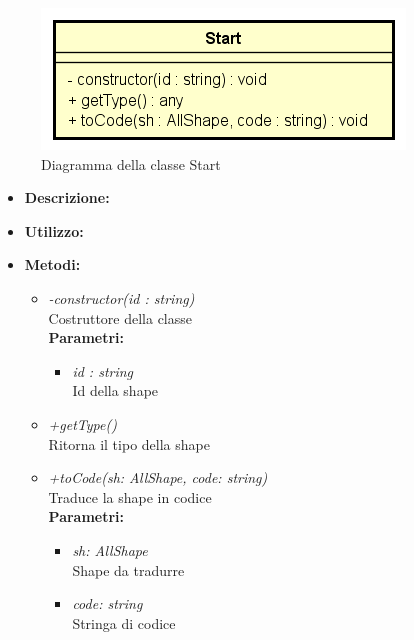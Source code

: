 \begin{figure}[h!]
	\centering
	\includegraphics[scale=0.8]{res/sections/SpecificaFrontEnd/Services/Disegnetti/start.png}
	\caption{Diagramma della classe Start}
\end{figure}

\begin{itemize}
	\item \textbf{Descrizione:}\\
	
	\item \textbf{Utilizzo:}\\
	
	\item \textbf{Metodi:}
		\begin{itemize}
			\item \emph{-constructor(id : string)}\\
    		Costruttore della classe\\
    		\textbf{Parametri:}
    		\begin{itemize}
    			\item \emph{id : string}\\
    			Id della shape
    		\end{itemize}
    		\item \emph{+getType()}\\
    		Ritorna il tipo della shape
    		\item \emph{+toCode(sh: AllShape, code: string)}\\
    		Traduce la shape in codice\\
    		\textbf{Parametri:}
    		\begin{itemize}
    			\item \emph{sh: AllShape}\\
    			Shape da tradurre
    			\item \emph{code: string}\\
    			Stringa di codice
    		\end{itemize}
    	\end{itemize}
\end{itemize}